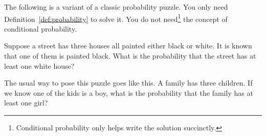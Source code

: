 \documentclass[../main.tex]{subfiles}
\begin{document}
The following is a variant of a classic probability puzzle. You only need Definition~\ref{def:probability} to solve it. You do not need\footnote{Conditional probability only helps write the solution succinctly.} the concept of conditional probability.

\begin{exercise} \label{ex:probability-three-houses}
  Suppose a street has three houses all painted either black or white. It is known that one of them is painted black. What is the probability that the street has at least one white house?

  {\footnotesize The usual way to pose this puzzle goes like this. A family has three children. If we know one of the kids is a boy, what is the probability that the family has at least one girl?}

  \blanks*
\end{exercise}
\clearpage
\end{document}
